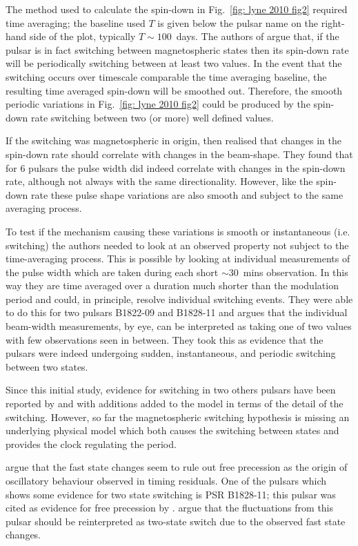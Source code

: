 The method used to calculate the spin-down in Fig.~\ref{fig: lyne 2010 fig2}
required time averaging; the baseline used $T$ is given below the pulsar name
on the right-hand side of the plot, typically $T\sim100$~days. The authors of
\citet{Lyne2010} argue that, if the pulsar is in fact switching between
magnetospheric states then its spin-down rate will be periodically switching
between at least two values. In the event that the switching occurs over
timescale comparable the time averaging baseline, the resulting time averaged
spin-down will be smoothed out. Therefore, the smooth periodic variations in
Fig.~\ref{fig: lyne 2010 fig2} could be produced by the spin-down rate
switching between two (or more) well defined values.

If the switching was magnetospheric in origin, then \citet{Lyne2010} realised
that changes in the spin-down rate should correlate with changes in the
beam-shape.  They found that for 6 pulsars the pulse width did indeed correlate
with changes in the spin-down rate, although not always with the same
directionality.  However, like the spin-down rate these pulse shape variations
are also smooth and subject to the same averaging process.

To test if the mechanism causing these variations is smooth or instantaneous
(i.e. switching) the authors needed to look at an observed property not subject
to the time-averaging process.  This is possible by looking at individual
measurements of the pulse width which are taken during each short $\sim30$~mins
observation. In this way they are time averaged over a duration much shorter
than the modulation period and could, in principle, resolve individual
switching events. They were able to do this for two pulsars B1822-09 and
B1828-11 and argues that the individual beam-width measurements, by eye, can be
interpreted as taking one of two values with few observations seen in between.
They took this as evidence that the pulsars were indeed undergoing sudden,
instantaneous, and periodic switching between two states.

Since this initial study, evidence for switching in two others pulsars have
been reported by \citet{Perera2014} and \citet{Perera2016} with additions added
to the model in terms of the detail of the switching. However, so far the
magnetospheric switching hypothesis is missing an underlying physical model
which both causes the switching between states and provides the clock regulating
the period.

\citet{Lyne2010} argue that the fast state changes seem to rule out free
precession as the origin of oscillatory behaviour observed in timing residuals.
One of the pulsars which shows some evidence for two state switching is PSR
B1828-11; this pulsar was cited as evidence for free precession by
\citet{Akgun2006}. \citet{Lyne2010} argue that the fluctuations from this pulsar
should be reinterpreted as two-state switch due to the observed fast state
changes.

